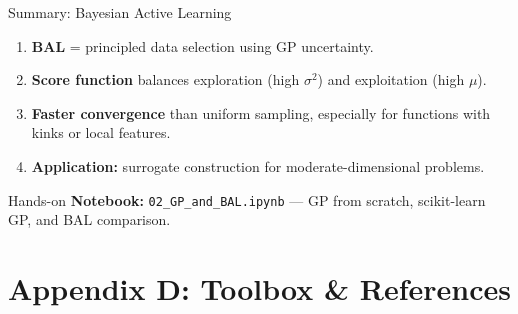 \documentclass[aspectratio=169,11pt]{beamer}
\begin{document}
\begin{frame}{Summary: Bayesian Active Learning}
\begin{enumerate}
  \item \textbf{BAL} = principled data selection using GP uncertainty.
  \item \textbf{Score function} balances exploration (high $\sigma^2$) and exploitation (high $\mu$).
  \item \textbf{Faster convergence} than uniform sampling, especially for functions with kinks or local features.
  \item \textbf{Application:} surrogate construction for moderate-dimensional problems.
\end{enumerate}

\vspace{0.3cm}
\begin{block}{Hands-on}
\textbf{Notebook:} \texttt{02\_GP\_and\_BAL.ipynb} --- GP from scratch, scikit-learn GP, and BAL comparison.
\end{block}
\end{frame}
\section{Appendix D: Toolbox \& References}
\end{document}
